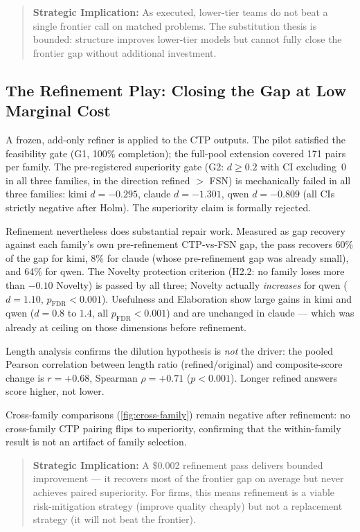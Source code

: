 \documentclass[12pt,a4paper]{article}
\begin{document}
\begin{quote}
\textbf{Strategic Implication:} As executed, lower-tier teams do not beat a single
frontier call on matched problems. The substitution thesis is bounded: structure
improves lower-tier models but cannot fully close the frontier gap without additional
investment.
\end{quote}

\subsection{The Refinement Play: Closing the Gap at Low Marginal Cost}\label{sec:refinement}

A frozen, add-only refiner is applied to the CTP outputs. The pilot satisfied
the feasibility gate (G1, 100\% completion); the full-pool extension covered 171
pairs per family. The pre-registered superiority gate (G2: $d \ge 0.2$ with CI
excluding~0 in all three families, in the direction refined $>$ FSN) is
mechanically failed in all three families: kimi $d = -0.295$, claude $d =
-1.301$, qwen $d = -0.809$ (all CIs strictly negative after Holm). The
superiority claim is formally rejected.

Refinement nevertheless does substantial repair work. Measured as gap recovery
against each family's own pre-refinement CTP-vs-FSN gap, the pass recovers 60\%
of the gap for kimi, 8\% for claude (whose pre-refinement gap was already
small), and 64\% for qwen. The Novelty protection criterion (H2.2: no family
loses more than $-0.10$ Novelty) is passed by all three; Novelty actually
\emph{increases} for qwen ($d = 1.10$, $p_{\mathrm{FDR}} < 0.001$). Usefulness
and Elaboration show large gains in kimi and qwen ($d = 0.8$ to $1.4$, all
$p_{\mathrm{FDR}} < 0.001$) and are unchanged in claude --- which was already at
ceiling on those dimensions before refinement.

Length analysis confirms the dilution hypothesis is \emph{not} the driver: the
pooled Pearson correlation between length ratio (refined/original) and
composite-score change is $r = +0.68$, Spearman $\rho = +0.71$ ($p < 0.001$).
Longer refined answers score higher, not lower.

Cross-family comparisons (\cref{fig:cross-family}) remain negative after
refinement: no cross-family CTP pairing flips to superiority, confirming that
the within-family result is not an artifact of family selection.

\begin{quote}
\textbf{Strategic Implication:} A \$0.002 refinement pass delivers bounded
improvement --- it recovers most of the frontier gap on average but never
achieves paired superiority. For firms, this means refinement is a viable
risk-mitigation strategy (improve quality cheaply) but not a replacement
strategy (it will not beat the frontier).
\end{quote}
\end{document}
